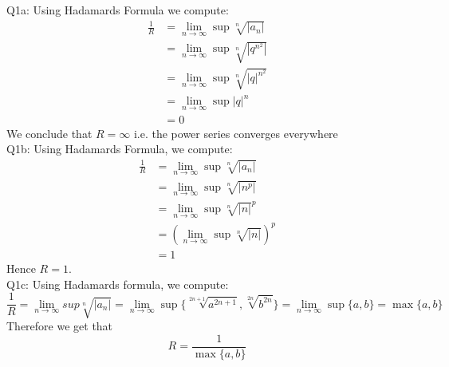 \documentclass[letterpaper]{article}
\begin{document}
\noindent
Q1a: Using Hadamards Formula we compute:
\begin{align*}
    \frac{1}{R} & = \lim_{n \to \infty} \sup \sqrt[n]{|a_n|}
    \\ & = \lim_{n \to \infty} \sup \sqrt[n]{|q^{n^2}|}
    \\ & = \lim_{n \to \infty} \sup \sqrt[n]{|q|^{n^2}}
    \\ & = \lim_{n \to \infty} \sup |q|^n
    \\ & = 0 \tag{since $|q|<1$ and hence its power approaches 0}
\end{align*}
We conclude that $R = \infty$ i.e. the power series converges everywhere
\newline \\ \noindent
Q1b: Using Hadamards Formula, we compute:
\begin{align*}
    \frac{1}{R} & = \lim_{n \to \infty} \sup \sqrt[n]{|a_n|}
    \\ & = \lim_{n \to \infty} \sup \sqrt[n]{|n^p|}
    \\ & = \lim_{n \to \infty} \sup \sqrt[n]{|n|}^p 
    \\ & = (\lim_{n \to \infty} \sup \sqrt[n]{|n|})^p
    \\ & = 1
\end{align*} Hence $R=1$. 
\newline \\ \noindent
Q1c: Using Hadamards formula, we compute: $$\frac{1}{R} = \lim_{n \to \infty} sup \sqrt[n]{|a_n|} = \lim_{n\to \infty} \sup \{\sqrt[2n+1]{a^{2n+1}} , \sqrt[2n]{b^{2n}}\} = \lim_{n \to \infty } \sup \{a,b\} = \max\{a,b\}$$
Therefore we get that $$R = \frac{1}{\max\{a,b\}}$$
\end{document}
